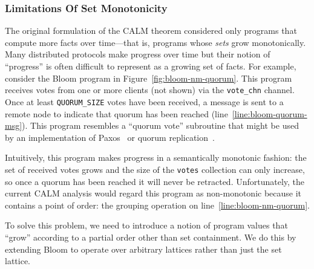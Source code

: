 \subsubsection{Limitations Of Set Monotonicity}
The original formulation of the CALM theorem considered only programs that
compute more facts over time---that is, programs whose \emph{sets} grow
monotonically. Many distributed protocols make progress over time but their
notion of ``progress'' is often difficult to represent as a growing set of
facts. For example, consider the Bloom program in
Figure~\ref{fig:bloom-nm-quorum}. This program receives votes from one or more
clients (not shown) via the \texttt{vote\_chn} channel. Once at least
\texttt{QUORUM\_SIZE} votes have been received, a message is sent to a remote
node to indicate that quorum has been reached
(line~\ref{line:bloom-quorum-msg}). This program resembles a ``quorum vote''
subroutine that might be used by an implementation of Paxos~\cite{Lamport1998}
or quorum replication~\cite{Gifford1979}.

Intuitively, this program makes progress in a semantically monotonic fashion:
the set of received votes grows and the size of the \texttt{votes} collection
can only increase, so once a quorum has been reached it will never be
retracted. Unfortunately, the current CALM analysis would regard this program as
non-monotonic because it contains a point of order: the grouping operation on
line~\ref{line:bloom-nm-quorum}.

To solve this problem, we need to introduce a notion of program values that
``grow'' according to a partial order other than set containment. We do this by
extending Bloom to operate over arbitrary lattices rather than just the
set lattice.


